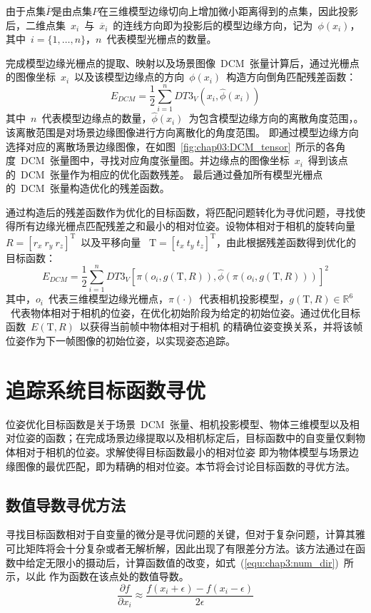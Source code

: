 由于点集$\overline P$是由点集$P$在三维模型边缘切向上增加微小距离得到的点集，因此投影后，二维点集~$x_i$~与~$\overline x_i$~的连线方向即为投影后的模型边缘方向，记为~$\phi (x_i)$，其中~$i=\{1,\dotsc ,n\}$，$n$~代表模型光栅点的数量。

完成模型边缘光栅点的提取、映射以及场景图像~DCM~张量计算后，通过光栅点的图像坐标~$x_i$~以及该模型边缘点的方向~$\phi (x_i)$~构造方向倒角匹配残差函数：
\begin{equation}
  \label{equ:chap3:dir_directional_function}
  E_{DCM}=\frac{1}{2}\sum _{i=1}^n DT3_V(x_i,\hat \phi(x_i))
\end{equation}
其中~$n$~代表模型边缘点的数量，$\hat \phi(x_i)$~为包含模型边缘方向的离散角度范围，。该离散范围是对场景边缘图像进行方向离散化的角度范围。
即通过模型边缘方向选择对应的离散场景边缘图像，在如图~\ref{fig:chap03:DCM_tensor}~所示的各角度~DCM~张量图中，寻找对应角度张量图。并边缘点的图像坐标~$x_i$~得到该点的~DCM~张量作为相应的优化函数残差。
最后通过叠加所有模型光栅点的~DCM~张量构造优化的残差函数。

通过构造后的残差函数作为优化的目标函数，将匹配问题转化为寻优问题，寻找使得所有边缘光栅点匹配残差之和最小的相对位姿。设物体相对于相机的旋转向量~$R=[r_x~r_y~r_z]^{\textrm{T}}$~以及平移向量
~$\textrm{T}=[t_x~t_y~t_z]^{\textrm{T}}$，由此根据残差函数得到优化的目标函数：
\begin{equation}
  \label{equ:chap3:dir_func}
  E_{DCM}=\frac{1}{2}\sum _{i=1}^n DT3_V[\pi (o_i,g(\textrm{T},R)),\hat \phi(\pi (o_i,g(\textrm{T},R)))]^2
\end{equation}
其中，$o_i$~代表三维模型边缘光栅点，$\pi(\cdot)$~代表相机投影模型，$g(\textrm{T},R)\in \mathbb{R}^6$~代表物体相对于相机的位姿，在优化初始阶段为给定的初始位姿。通过优化目标函数~$E(\textrm{T},R)$~以获得当前帧中物体相对于相机
的精确位姿变换关系，并将该帧位姿作为下一帧图像的初始位姿，以实现姿态追踪。
\section{追踪系统目标函数寻优}
\label{sec:Optimization of objective function}
位姿优化目标函数是关于场景~DCM~张量、相机投影模型、物体三维模型以及相对位姿的函数；在完成场景边缘提取以及相机标定后，目标函数中的自变量仅剩物体相对于相机的位姿。求解使得目标函数最小的相对位姿
即为物体模型与场景边缘图像的最优匹配，即为精确的相对位姿。本节将会讨论目标函数的寻优方法。
\subsection{数值导数寻优方法}
\label{sec:optimizing numerical derivative}
寻找目标函数相对于自变量的微分是寻优问题的关键，但对于复杂问题，计算其雅可比矩阵将会十分复杂或者无解析解，因此出现了有限差分方法。该方法通过在函数中给定无限小的摄动后，计算函数值的改变，如式~(\ref{equ:chap3:num_dir})~所示，以此
作为函数在该点处的数值导数。
\begin{equation}
  \label{equ:chap3:num_dir}
  \frac{\partial f}{\partial x_i}\approx \frac{f(x_i+\epsilon)-f(x_i-\epsilon)}{2\epsilon}
\end{equation}


